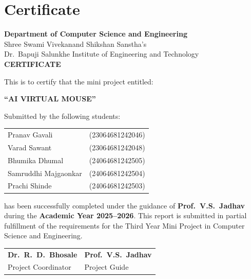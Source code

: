 \documentclass[12pt,a4paper]{report}
\begin{document}
\chapter*{Certificate}
\thispagestyle{plain}

\begin{center}
  {\large\bfseries Department of Computer Science and Engineering}\\[0.2cm]
  {\normalsize Shree Swami Vivekanand Shikshan Sanstha's\\
  Dr.\ Bapuji Salunkhe Institute of Engineering and Technology}\\[0.6cm]
  {\LARGE\bfseries\color{red} CERTIFICATE}
\end{center}

\vspace{0.5cm}
This is to certify that the mini project entitled:

\begin{center}
  {\large\bfseries\color{red} ``AI VIRTUAL MOUSE''}
\end{center}

Submitted by the following students:

\begin{center}
  \begin{tabular}{ll}
    Pranav Gavali        & (23064681242046) \\
    Varad Sawant         & (23064681242048) \\
    Bhumika Dhumal       & (24064681242505) \\
    Samruddhi Majgaonkar & (24064681242504) \\
    Prachi Shinde        & (24064681242503) \\
  \end{tabular}
\end{center}

has been successfully completed under the guidance of \textbf{Prof.\ V.S.\ Jadhav} during the
\textbf{Academic Year 2025--2026}. This report is submitted in partial fulfillment of the
requirements for the Third Year Mini Project in Computer Science and Engineering.

\vspace{1.5cm}
\begin{tabular}{p{6cm}p{6cm}}
  \textbf{Dr.\ R.\ D.\ Bhosale}      & \textbf{Prof.\ V.S.\ Jadhav} \\
  Project Coordinator                 & Project Guide                 \\
\end{tabular}
\end{document}
